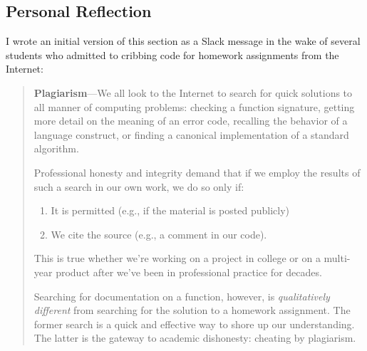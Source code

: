 \subsection{Personal Reflection}

I wrote an initial version of this section
as a Slack message
in the wake of several students who admitted to cribbing code
for homework assignments
from the Internet:
\begin{quotation}
  \textbf{Plagiarism}---We all look to the Internet
  to search for quick solutions to all manner of computing problems:
  checking a function signature,
  getting more detail on the meaning of an error code,
  recalling the behavior of a language construct,
  or finding a canonical implementation of a standard algorithm.

  Professional honesty and integrity demand
  that if we employ the results of such a search in our own work,
  we do so only if:
  \begin{enumerate}
  \item
    It is permitted (e.g., if the material is posted publicly)
  \item 
    We cite the source (e.g., a comment in our code).
  \end{enumerate}
  This is true whether we're working on a project in college
  or on a multi-year product after we've been in professional practice for decades.
  
  Searching for documentation on a function,
  however,
  is \emph{qualitatively different}
  from searching for the solution to a homework assignment.
  The former search is a quick and effective way
  to shore up our understanding.
  The latter is the gateway to academic dishonesty: cheating by plagiarism.
  

\end{quotation}
